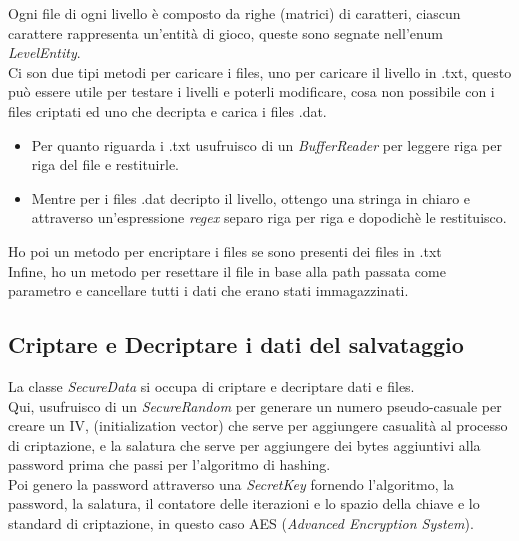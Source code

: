 \textsf{\small Ogni file di ogni livello è composto da righe (matrici) di caratteri, ciascun carattere rappresenta un'entità di gioco, queste sono segnate nell'enum \emph{LevelEntity}.} \\

\textsf{\small Ci son due tipi metodi per caricare i files, uno per caricare il livello in .txt, questo può essere utile per testare i livelli e poterli modificare, cosa non possibile con i files criptati ed uno che decripta e carica i files .dat.} 

\begin{itemize}
	\item \textsf{\small Per quanto riguarda i .txt usufruisco di un \emph{BufferReader} per leggere riga per riga del file e restituirle.} 
	\item \textsf{\small Mentre per i files .dat decripto il livello, ottengo una stringa in chiaro e attraverso un'espressione \emph{regex} separo riga per riga e dopodichè le restituisco.}  \\
\end{itemize}

\textsf{\small Ho poi un metodo per encriptare i files se sono presenti dei files in .txt} \\

\textsf{\small Infine, ho un metodo per resettare il file in base alla path passata come parametro e cancellare tutti i dati che erano stati immagazzinati.}\\

\subsection{Criptare e Decriptare i dati del salvataggio}

\textsf{\small La classe \emph{SecureData} si occupa di criptare e decriptare dati e files.} \\

\textsf{\small Qui, usufruisco di un \emph{SecureRandom} per generare un numero pseudo-casuale per creare un IV, (initialization vector) che serve per aggiungere casualità al processo di criptazione, e la salatura che serve per aggiungere dei bytes aggiuntivi alla password prima che passi per l'algoritmo di hashing. } \\

\textsf{\small Poi genero la password attraverso una \emph{SecretKey} fornendo l'algoritmo, la password, la salatura, il contatore delle iterazioni e lo spazio della chiave e lo standard di criptazione, in questo caso AES (\emph{Advanced Encryption System}).} \\

